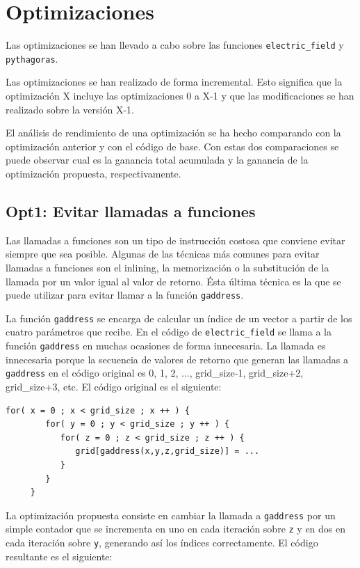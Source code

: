 \section{Optimizaciones}

Las optimizaciones se han llevado a cabo sobre las funciones
\texttt{electric\_field} y \texttt{pythagoras}.

Las optimizaciones se han realizado de forma incremental. Esto significa que la
optimizaci\'{o}n X incluye las optimizaciones 0 a X-1 y que las modificaciones
se han realizado sobre la versi\'{o}n X-1.

El an\'{a}lisis de rendimiento de una optimizaci\'{o}n se ha hecho comparando
con la optimizaci\'{o}n anterior y con el c\'{o}digo de base. Con estas dos
comparaciones se puede observar cual es la ganancia total acumulada y la
ganancia de la optimizaci\'{o}n propuesta, respectivamente.

\subsection{Opt1: Evitar llamadas a funciones}

Las llamadas a funciones son un tipo de instrucci\'{o}n costosa que conviene
evitar siempre que sea posible. Algunas de las t\'{e}cnicas m\'{a}s comunes
para evitar llamadas a funciones son el inlining, la memorizaci\'{o}n o la
substituci\'{o}n de la llamada por un valor igual al valor de retorno.
\'{E}sta \'{u}ltima t\'{e}cnica es la que se puede utilizar para evitar llamar
a la funci\'{o}n \texttt{gaddress}.

La funci\'{o}n \texttt{gaddress} se encarga de calcular un \'{i}ndice de un
vector a partir de los cuatro par\'{a}metros que recibe. En el c\'{o}digo de
\texttt{electric\_field} se llama a la funci\'{o}n \texttt{gaddress} en
muchas ocasiones de forma innecesaria. La llamada es innecesaria porque la
secuencia de valores de retorno que generan las llamadas a \texttt{gaddress}
en el c\'{o}digo original es 0, 1, 2, ..., grid\_size-1, grid\_size+2,
grid\_size+3, etc. El c\'{o}digo original es el siguiente:

\begin{lstlisting}[]
     for( x = 0 ; x < grid_size ; x ++ ) {
        for( y = 0 ; y < grid_size ; y ++ ) {
           for( z = 0 ; z < grid_size ; z ++ ) {
              grid[gaddress(x,y,z,grid_size)] = ...
           }
        }
     }
\end{lstlisting}

La optimizaci\'{o}n propuesta consiste en cambiar la llamada a
\texttt{gaddress} por un simple contador que se incrementa en uno en cada
iteraci\'{o}n sobre \texttt{z} y en dos en cada iteraci\'{o}n sobre
\texttt{y}, generando as\'{i} los \'{i}ndices correctamente. El c\'{o}digo
resultante es el siguiente:

